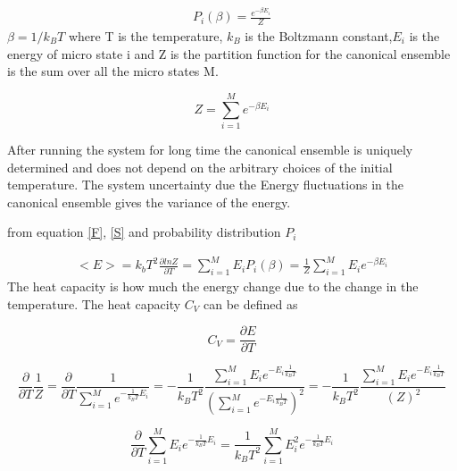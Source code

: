 \documentclass[10pt,a4paper]{article}
\begin{document}
\begin{align}
P_i (\beta) =\frac{ e^{- \beta E_i}}{Z}
\end{align} 
$\beta = 1/k_B T$ where T is the temperature, $k_B$ is the Boltzmann constant,$E_i$ is the energy of micro state i and Z is the partition function for the canonical ensemble is the sum over all the micro states M.

\begin{equation}
  Z=\sum_{i=1}^{M}e^{- \beta E_i}
\end{equation}
   
After running the system for long time the canonical ensemble is uniquely determined and does not depend on the arbitrary choices of the initial temperature.
The system uncertainty due the Energy fluctuations in the canonical ensemble gives the variance of the energy.\\
 


\centerline{ from equation \ref{F}, \ref{S} and probability distribution $P_i$ }
\begin{align}
<E> = k_b T^2 \frac{\partial lnZ}{\partial T}=\sum_{i=1}^{M} E_iP_i(\beta)=\frac{1}{Z }\sum_{i=1}^{M}E_i e ^{ - \beta E_i}
\end{align}
The heat capacity is how much the energy change due to the change in the temperature. The heat capacity $C_V$ can be defined as

\begin{equation}
C_V =\frac{\partial E}{\partial T} 
\end{equation}

\begin{equation}
\frac{\partial}{\partial T}\frac{1}{Z} = \frac{\partial}{\partial T}\frac{1}{\sum_{i=1}^{M}e^{- \frac{1}{k_BT} E_i}} = -\frac{1}{k_B T^2 } \frac{\sum_{i=1}^{M} E_i e^{-E_i \frac{1}{k_BT}}}{\left(\sum_{i=1}^{M} e^{-E_i \frac{1}{k_BT}} \right)^2}=-\frac{1}{k_B T^2 } \frac{\sum_{i=1}^{M} E_i e^{-E_i \frac{1}{k_BT}}}{\left( Z\right)^2}
\end{equation}

\begin{equation}
\frac{\partial}{\partial T}\sum_{i=1}^{M}E_i e ^{ - \frac {1}{k_BT} E_i} = \frac{1}{k_BT^2}\sum_{i=1}^{M}E_i^2 e ^{ - \frac {1}{k_BT} E_i}
\end{equation}
\end{document}
